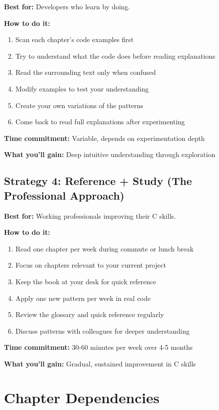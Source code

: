 \documentclass[11pt,openany]{book}
\begin{document}
\textbf{Best for:} Developers who learn by doing.

\textbf{How to do it:}
\begin{enumerate}
    \item Scan each chapter's code examples first
    \item Try to understand what the code does before reading explanations
    \item Read the surrounding text only when confused
    \item Modify examples to test your understanding
    \item Create your own variations of the patterns
    \item Come back to read full explanations after experimenting
\end{enumerate}

\textbf{Time commitment:} Variable, depends on experimentation depth

\textbf{What you'll gain:} Deep intuitive understanding through exploration

\subsection*{Strategy 4: Reference + Study (The Professional Approach)}

\textbf{Best for:} Working professionals improving their C skills.

\textbf{How to do it:}
\begin{enumerate}
    \item Read one chapter per week during commute or lunch break
    \item Focus on chapters relevant to your current project
    \item Keep the book at your desk for quick reference
    \item Apply one new pattern per week in real code
    \item Review the glossary and quick reference regularly
    \item Discuss patterns with colleagues for deeper understanding
\end{enumerate}

\textbf{Time commitment:} 30-60 minutes per week over 4-5 months

\textbf{What you'll gain:} Gradual, sustained improvement in C skills

\section*{Chapter Dependencies}
\end{document}

